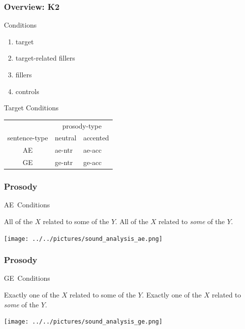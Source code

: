 \documentclass[fleqn,10pt,xcolor=dvipsnames]{beamer}
\renewcommand{\AE}{AE\xspace}
\newcommand{\GE}{GE\xspace}
\begin{document}
\begin{frame}
  \frametitle{Overview: K2}
  \begin{block}{Conditions}
    \begin{enumerate}
    \item target
    \item target-related fillers
    \item fillers
    \item controls
    \end{enumerate}
  \end{block}

  \begin{block}{Target Conditions}
      \begin{center}
        \begin{tabular}{cll}
          & \multicolumn{2}{c}{prosody-type} \\ 
          sentence-type & neutral & accented \\ \midrule
          \AE & ae-ntr & ae-acc \\
          \GE & ge-ntr & ge-acc\\
        \end{tabular}
      \end{center}
  \end{block}

\end{frame}

\begin{frame}
  \frametitle{Prosody}
  \begin{block}{\AE\ Conditions}
    \begin{exe}
      \ex
      \begin{xlist}
      \ex All of the $X$ related to some of the $Y$.
      \ex All of the $X$ related to \emph{some} of the $Y$.
      \end{xlist}
    \end{exe}

    \medskip

      \texttt{[image: ../../pictures/sound\_analysis\_ae.png]}

  \end{block}
\end{frame}


\begin{frame}
  \frametitle{Prosody}
  \begin{block}{\GE\ Conditions}
    \begin{exe}
      \ex
      \begin{xlist}
      \ex Exactly one of the $X$ related to some of the $Y$.
      \ex Exactly one of the $X$ related to \emph{some} of the $Y$.
      \end{xlist}
    \end{exe}

    \medskip

      \texttt{[image: ../../pictures/sound\_analysis\_ge.png]}

  \end{block}
\end{frame}
\end{document}
